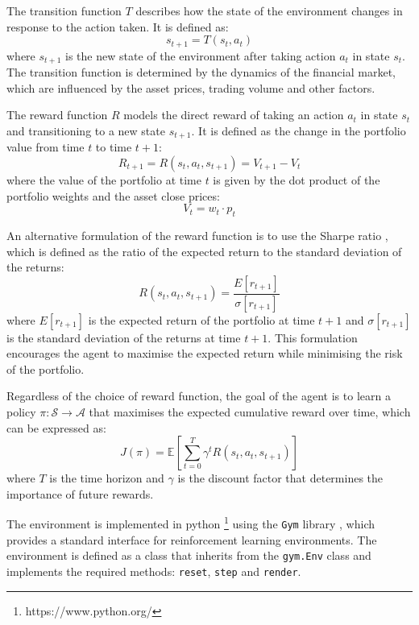 The transition function $T$ describes how the state of the environment changes in response to the action taken. It is defined as:
\begin{equation}
    s_{t+1} = T(s_t, a_t)
\end{equation}
where $s_{t+1}$ is the new state of the environment after taking action $a_t$ in state $s_t$. The transition function is determined by the dynamics of the financial market, which are influenced by the asset prices, trading volume and other factors.

The reward function $R$ models the direct reward of taking an action $a_t$ in state $s_t$ and transitioning to a new state $s_{t+1}$. It is defined as the change in the portfolio value from time $t$ to time $t+1$:
\begin{equation}
    R_{t+1} = R(s_t, a_t, s_{t+1}) = V_{t+1} - V_t
\end{equation}
where the value of the portfolio at time $t$ is given by the dot product of the portfolio weights and the asset close prices:
\begin{equation}
    V_t = w_t \cdot p_t
\end{equation}

An alternative formulation of the reward function is to use the Sharpe ratio \cite{Sharpe1994}, which is defined as the ratio of the expected return to the standard deviation of the returns:
\begin{equation}
    R(s_t, a_t, s_{t+1}) = \frac{E[r_{t+1}]}{\sigma[r_{t+1}]}
\end{equation}
where $E[r_{t+1}]$ is the expected return of the portfolio at time $t+1$ and $\sigma[r_{t+1}]$ is the standard deviation of the returns at time $t+1$. This formulation encourages the agent to maximise the expected return while minimising the risk of the portfolio.

Regardless of the choice of reward function, the goal of the agent is to learn a policy $\pi: \mathcal{S} \to \mathcal{A}$ that maximises the expected cumulative reward over time, which can be expressed as:
\begin{equation}
    J(\pi) = \mathbb{E} \left[\sum_{t=0}^{T} \gamma^t R(s_t, a_t, s_{t+1}) \right]
\end{equation} 
where $T$ is the time horizon and $\gamma$ is the discount factor that determines the importance of future rewards. 

The environment is implemented in \Gls{python} \footnote{https://www.python.org/} using the \texttt{Gym} library \cite{Brockman2016}, which provides a standard interface for reinforcement learning environments. The environment is defined as a class that inherits from the \texttt{gym.Env} class and implements the required methods: \texttt{reset}, \texttt{step} and \texttt{render}.

